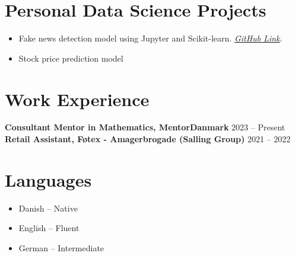 \documentclass[a4paper,10pt]{article}
\begin{document}
\section*{Personal Data Science Projects}
\begin{itemize}[noitemsep, topsep=0pt]
    \item Fake news detection model using Jupyter and Scikit-learn. \href{https://github.com/P1N60/gdsProjekt}{\textit{GitHub Link}}.
    \item Stock price prediction model
\end{itemize}
\n
\section*{Work Experience}
\textbf{Consultant Mentor in Mathematics, MentorDanmark} \hfill 2023 -- Present \\
\textbf{Retail Assistant, F\o tex - Amagerbrogade (Salling Group)} \hfill 2021 -- 2022

\section*{Languages}
\begin{itemize}[noitemsep, topsep=0pt]
    \item Danish -- Native
    \item English -- Fluent
    \item German -- Intermediate
\end{itemize}
\end{document}
